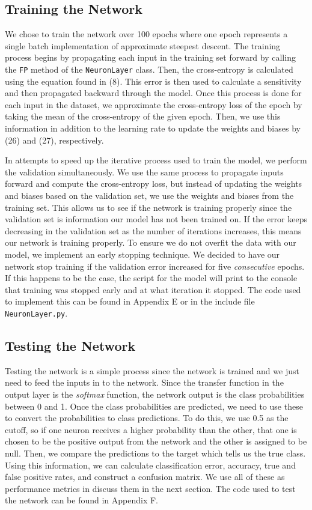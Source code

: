 \documentclass[12pt,halfline,a4paper]{ouparticle}
\begin{document}
\subsection{Training the Network}
We chose to train the network over 100 epochs where one epoch represents a single batch implementation of approximate steepest descent. The training process begins by propagating each input in the training set forward by calling the \verb|FP| method of the \verb|NeuronLayer| class. Then, the cross-entropy is calculated using the equation found in (8). This error is then used to calculate a sensitivity and then propagated backward through the model. Once this process is done for each input in the dataset, we approximate the cross-entropy loss of the epoch by taking the mean of the cross-entropy of the given epoch. Then, we use this information in addition to the learning rate to update the weights and biases by (26) and (27), respectively. 

In attempts to speed up the iterative process used to train the model, we perform the validation simultaneously.  We use the same process to propagate inputs forward and compute the cross-entropy loss, but instead of updating the weights and biases based on the validation set, we use the weights and biases from the training set. This allows us to see if the network is training properly since the validation set is information our model has not been trained on. If the error keeps decreasing in the validation set as the number of iterations increases, this means our network is training properly. To ensure we do not overfit the data with our model, we implement an early stopping technique. We decided to have our network stop training if the validation error increased for five \emph{consecutive} epochs. If this happens to be the case, the script for the model will print to the console that training was stopped early and at what iteration it stopped. The code used to implement this can be found in Appendix E or in the include file \verb|NeuronLayer.py|.  

\subsection{Testing the Network}
Testing the network is a simple process since the network is trained and we just need to feed the inputs in to the network. Since the transfer function in the output layer is the \emph{softmax} function, the network output is the class probabilities between 0 and 1. Once the class probabilities are predicted, we need to use these to convert the probabilities to class predictions. To do this, we use 0.5 as the cutoff, so if one neuron receives a higher probability than the other, that one is chosen to be the positive output from the network and the other is assigned to be null. Then, we compare the predictions to the target which tells us the true class. Using this information, we can calculate classification error, accuracy, true and false positive rates, and construct a confusion matrix. We use all of these as performance metrics in discuss them in the next section. The code used to test the network can be found in Appendix F.
\end{document}
